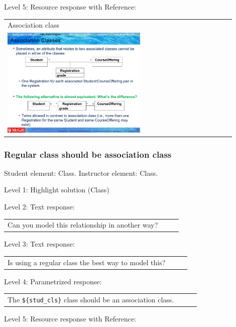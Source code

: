 \noindent Level 5: Resource response with Reference: \medskip

\begin{tabular}{|p{0.9\linewidth}}
Association class

\\
\includegraphics[width=0.6\textwidth]{images/association_class.png}
\end{tabular} \medskip


\subsubsection{Regular class should be association class}

Student element: Class. Instructor element: Class. \medskip

\noindent Level 1: Highlight solution (Class) \medskip

\noindent Level 2: Text response: \medskip

\begin{tabular}{|p{0.9\linewidth}}
Can you model this relationship in another way?
\end{tabular} \medskip

\noindent Level 3: Text response: \medskip

\begin{tabular}{|p{0.9\linewidth}}
Is using a regular class the best way to model this?
\end{tabular} \medskip

\noindent Level 4: Parametrized response: \medskip

\begin{tabular}{|p{0.9\linewidth}}
The \verb|${stud_cls}| class should be an association class.
\end{tabular} \medskip

\noindent Level 5: Resource response with Reference: \medskip

